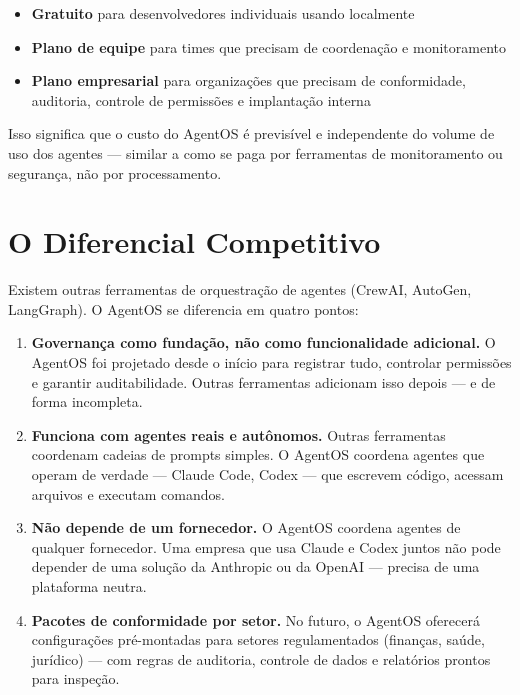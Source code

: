 \documentclass[12pt, a4paper]{article}
\begin{document}
\begin{itemize}[leftmargin=1.5em]
    \item \textbf{Gratuito} para desenvolvedores individuais usando localmente
    \item \textbf{Plano de equipe} para times que precisam de coordenação e monitoramento
    \item \textbf{Plano empresarial} para organizações que precisam de conformidade, auditoria, controle de permissões e implantação interna
\end{itemize}

Isso significa que o custo do AgentOS é previsível e independente do volume de uso dos agentes --- similar a como se paga por ferramentas de monitoramento ou segurança, não por processamento.

\section{O Diferencial Competitivo}

Existem outras ferramentas de orquestração de agentes (CrewAI, AutoGen, LangGraph). O AgentOS se diferencia em quatro pontos:

\begin{enumerate}[leftmargin=1.5em]
    \item \textbf{Governança como fundação, não como funcionalidade adicional.} O AgentOS foi projetado desde o início para registrar tudo, controlar permissões e garantir auditabilidade. Outras ferramentas adicionam isso depois --- e de forma incompleta.

    \item \textbf{Funciona com agentes reais e autônomos.} Outras ferramentas coordenam cadeias de prompts simples. O AgentOS coordena agentes que operam de verdade --- Claude Code, Codex --- que escrevem código, acessam arquivos e executam comandos.

    \item \textbf{Não depende de um fornecedor.} O AgentOS coordena agentes de qualquer fornecedor. Uma empresa que usa Claude e Codex juntos não pode depender de uma solução da Anthropic ou da OpenAI --- precisa de uma plataforma neutra.

    \item \textbf{Pacotes de conformidade por setor.} No futuro, o AgentOS oferecerá configurações pré-montadas para setores regulamentados (finanças, saúde, jurídico) --- com regras de auditoria, controle de dados e relatórios prontos para inspeção.
\end{enumerate}
\end{document}
